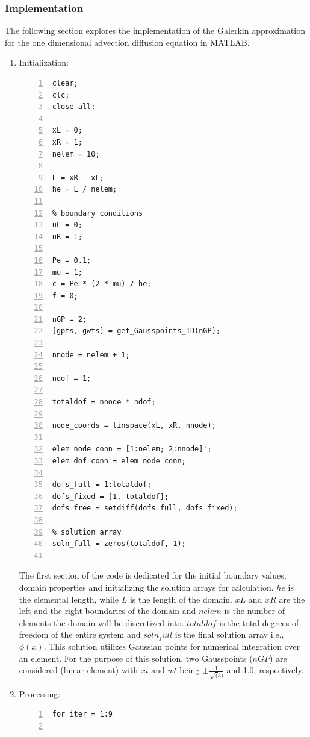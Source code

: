 \documentclass[12pt, oneside]{article}
\begin{document}
\subsubsection{Implementation}
The following section explores the implementation of the Galerkin approximation for the one dimensional advection diffusion equation in MATLAB.
\begin{enumerate}
    \item Initialization:
	\begin{lstlisting}[frame=single, numbers=left, style=Matlab-editor]
	    %% 1D steady state advection diffusion
clear;
clc;
close all;

xL = 0;
xR = 1;
nelem = 10;

L = xR - xL;
he = L / nelem;

% boundary conditions
uL = 0;
uR = 1;

Pe = 0.1;
mu = 1;
c = Pe * (2 * mu) / he;
f = 0;

nGP = 2;
[gpts, gwts] = get_Gausspoints_1D(nGP);

nnode = nelem + 1;

ndof = 1;

totaldof = nnode * ndof;

node_coords = linspace(xL, xR, nnode);

elem_node_conn = [1:nelem; 2:nnode]';
elem_dof_conn = elem_node_conn;

dofs_full = 1:totaldof;
dofs_fixed = [1, totaldof];
dofs_free = setdiff(dofs_full, dofs_fixed);

% solution array
soln_full = zeros(totaldof, 1);
	
	\end{lstlisting}
	The first section of the code is dedicated for the initial boundary values, domain properties and initializing the solution arrays for calculation. $he$ is the elemental length, while $L$ is the length of the domain. $xL$ and $xR$ are the left and the right boundaries of the domain and $nelem$ is the number of elements the domain will be discretized into. $totaldof$ is the total degrees of freedom of the entire system and $soln_full$ is the final solution array i.e., $\phi(x)$. This solution utilizes Gaussian points for numerical integration over an element. For the purpose of this solution, two Gausspoints ($nGP$) are considered (linear element) with $xi$ and $wt$ being $\pm \frac{1}{\sqrt(3)}$ and 1.0, respectively. 
	\item Processing:
	   \begin{lstlisting}[frame=single, numbers=left, style=Matlab-editor]
%% Processing
for iter = 1:9


\end{lstlisting}
\end{enumerate}
\end{document}
